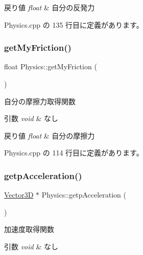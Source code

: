 \begin{DoxyRetVals}{戻り値}
{\em float} & 自分の反発力 \\
\hline
\end{DoxyRetVals}


 Physics.\+cpp の 135 行目に定義があります。

\mbox{\label{class_physics_a293e9ef38e53b79692c4a9d4a60b13ed}} 
\subsubsection{\texorpdfstring{get\+My\+Friction()}{getMyFriction()}}
{\footnotesize\ttfamily float Physics\+::get\+My\+Friction (\begin{DoxyParamCaption}{ }\end{DoxyParamCaption})}



自分の摩擦力取得関数 


\begin{DoxyParams}{引数}
{\em void} & なし \\
\hline
\end{DoxyParams}

\begin{DoxyRetVals}{戻り値}
{\em float} & 自分の摩擦力 \\
\hline
\end{DoxyRetVals}


 Physics.\+cpp の 114 行目に定義があります。

\mbox{\label{class_physics_a41b427ec429632a13db548bb5cc6642e}} 
\subsubsection{\texorpdfstring{getp\+Acceleration()}{getpAcceleration()}}
{\footnotesize\ttfamily \mbox{\hyperlink{class_vector3_d}{Vector3D}} $\ast$ Physics\+::getp\+Acceleration (\begin{DoxyParamCaption}{ }\end{DoxyParamCaption})}



加速度取得関数 


\begin{DoxyParams}{引数}
{\em void} & なし \\
\hline
\end{DoxyParams}

